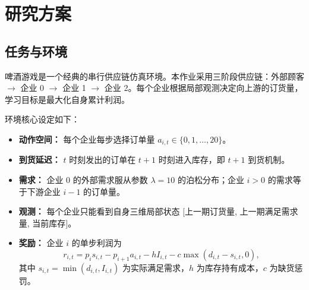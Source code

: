 \documentclass[nohyperref]{article}
\begin{document}

\printAffiliationsAndNotice{}

\begin{abstract}
本文针对啤酒游戏（Beer Game）供应链任务，研究如何使用深度强化学习优化链上单个企业的利润。首先复现了 DQN 系列基线算法（DQN、Double DQN、Dueling DQN、Dueling Double DQN），然后提出一种改进的 PPO 算法，通过引入状态与奖励归一化、裁剪值函数损失、GAE 优势估计、熵系数退火以及最优检查点选择等技巧，使其在三个随机种子上稳定超过最优 DQN 基线。此外，还尝试了背景策略对比与多智能体扩展实验，并对训练过程中的有趣现象进行了分析。
\end{abstract}

\section{研究方案}
\label{sec:scheme}

\subsection{任务与环境}

啤酒游戏是一个经典的串行供应链仿真环境。本作业采用三阶段供应链：外部顾客 $\rightarrow$ 企业 0 $\rightarrow$ 企业 1 $\rightarrow$ 企业 2。每个企业根据局部观测决定向上游的订货量，学习目标是最大化自身累计利润。

环境核心设定如下：
\begin{itemize}
    \item \textbf{动作空间：} 每个企业每步选择订单量 $a_{i,t}\in\{0,1,\dots,20\}$。
    \item \textbf{到货延迟：} $t$ 时刻发出的订单在 $t+1$ 时刻进入库存，即 $t+1$ 到货机制。
    \item \textbf{需求：} 企业 0 的外部需求服从参数 $\lambda=10$ 的泊松分布；企业 $i>0$ 的需求等于下游企业 $i-1$ 的订单量。
    \item \textbf{观测：} 每个企业只能看到自身三维局部状态 $[$上一期订货量, 上一期满足需求量, 当前库存$]$。
    \item \textbf{奖励：} 企业 $i$ 的单步利润为
    \begin{equation}
    r_{i,t}=p_i s_{i,t}-p_{i+1}a_{i,t}-h I_{i,t}-c\max(d_{i,t}-s_{i,t},0),
    \end{equation}
    其中 $s_{i,t}=\min(d_{i,t},I_{i,t})$ 为实际满足需求，$h$ 为库存持有成本，$c$ 为缺货惩罚。
\end{itemize}
\end{document}
